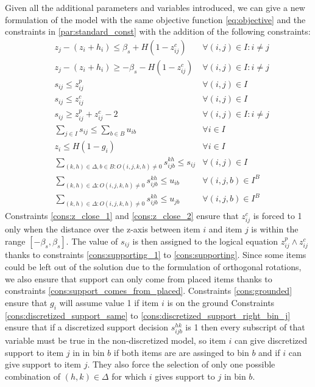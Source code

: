 Given all the additional parameters and variables introduced, we can give a new formulation of the model with the same objective function \ref{eq:objective} and the constraints in \cref{par:standard_const} with the addition of the following constraints:
\label{par:support_const}
\begin{align}
    & z_j - (z_i + h_i) \le \beta_s + H (1 - z^c_{ij}) & \forall (i, j) \in I : i \neq j \label{cons:z_close_1} \\
    & z_j - (z_i + h_i) \ge -\beta_s - H (1 - z^c_{ij}) & \forall (i, j) \in I : i \neq j \label{cons:z_close_2} \\
    & s_{ij} \le z^p_{ij} & \forall (i, j) \in I  \label{cons:supporting_1} \\
    & s_{ij} \le z^c_{ij} & \forall (i, j) \in I  \label{cons:supporting_2} \\
    & s_{ij} \ge z^p_{ij} + z^c_{ij} - 2 & \forall (i, j) \in I : i \neq j \label{cons:supporting} \\
    & \sum\limits_{j \in I}{s_{ij}} \le \sum\limits_{b \in B}{u_{ib}} & \forall i \in I  \label{cons:support_comes_from_placed} \\
    & z_i \le H(1 - g_i) & \forall i \in I \label{cons:grounded} \\
    & \sum\limits_{(k, h) \in \Delta, b \in B : O(i, j, k, h) \neq 0} s^{k h}_{i j b} \le s_{ij} & \forall (i, j) \in I \label{cons:discretized_support_same} \\
    & \sum\limits_{(k, h) \in \Delta : O(i, j, k, h) \neq 0} s^{k h}_{i j b} \le u_{ib} & \forall (i, j, b) \in I^B \label{cons:discretized_support_right_bin_i} \\
    & \sum\limits_{(k, h) \in \Delta : O(i, j, k, h) \neq 0} s^{k h}_{i j b} \le u_{jb} & \forall (i, j, b) \in I^B \label{cons:discretized_support_right_bin_j}
\end{align}
Constraints \ref{cons:z_close_1} and \ref{cons:z_close_2} ensure that $z^c_{ij}$ is forced to 1 only when the distance over the z-axis between item $i$ and item $j$ is within the range $[-\beta_s, \beta_s]$.
The value of $s_{ij}$ is then assigned to the logical equation $z^p_{ij} \land z^c_{ij}$ thanks to constraints \ref{cons:supporting_1} to \ref{cons:supporting}.
Since some items could be left out of the solution due to the formulation of orthogonal rotations, we also ensure that support can only come from placed items thanks to constraints \ref{cons:support_comes_from_placed}.
Constraints \ref{cons:grounded} ensure that $g_i$ will assume value 1 if item $i$ is on the ground
Constraints \ref{cons:discretized_support_same} to \ref{cons:discretized_support_right_bin_j} ensure that if a discretized support decision $s_{ijb}^{hk}$ is 1 then every subscript of that variable must be true in the non-discretized model, so item $i$ can give discretized support to item $j$ in in bin $b$ if both items are are assinged to bin $b$ and if $i$ can give support to item $j$. They also force the selection of only one possible combination of $(h,k) \in \Delta$ for which $i$ gives support to $j$ in bin $b$.

